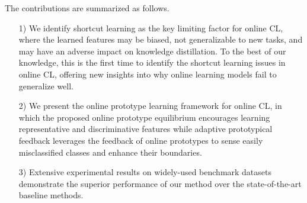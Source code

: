 The contributions are summarized as follows. 
\begin{enumerate}[leftmargin=12pt, itemsep=0pt, topsep=0pt, partopsep=0pt, noitemsep]
    \item[1)] We identify shortcut learning as the key limiting factor for online CL, where the learned features may be biased, not generalizable to new tasks, and may have an adverse impact on knowledge distillation. To the best of our knowledge, this is the first time to identify the shortcut learning issues in online CL, offering new insights into why online learning models fail to generalize well. 
    \item[2)] We present the online prototype learning framework for online CL, in which the proposed online prototype equilibrium encourages learning representative and discriminative features while adaptive prototypical feedback leverages the feedback of online prototypes to 
    sense easily misclassified classes and enhance their boundaries. 
    \item[3)] Extensive experimental results on widely-used benchmark datasets demonstrate the superior performance of our method over the state-of-the-art baseline methods.
\end{enumerate}





